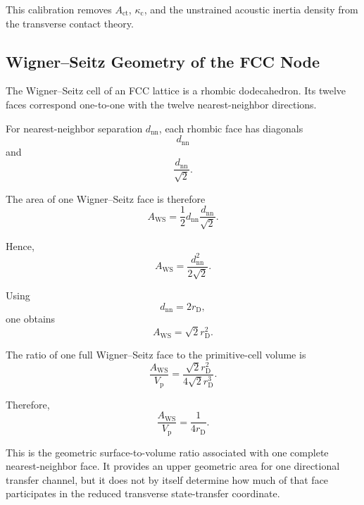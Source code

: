 This calibration removes $A_{\mathrm{ct}}$, $\kappa_{\mathrm{c}}$, and the unstrained acoustic inertia density from the transverse contact theory.

\subsection{Wigner--Seitz Geometry of the FCC Node}

The Wigner--Seitz cell of an FCC lattice is a rhombic dodecahedron. Its twelve faces correspond one-to-one with the twelve nearest-neighbor directions.

For nearest-neighbor separation $d_{\mathrm{nn}}$, each rhombic face has diagonals
\begin{equation}
    d_{\mathrm{nn}}
\end{equation}
and
\begin{equation}
    \frac{d_{\mathrm{nn}}}{\sqrt{2}}.
\end{equation}

The area of one Wigner--Seitz face is therefore
\begin{equation}
    A_{\mathrm{WS}} = \frac{1}{2} d_{\mathrm{nn}} \frac{d_{\mathrm{nn}}}{\sqrt{2}}.
\end{equation}

Hence,
\begin{equation}
    \boxed{ A_{\mathrm{WS}} = \frac{d_{\mathrm{nn}}^2}{2\sqrt{2}} }.
\end{equation}

Using
\begin{equation}
    d_{\mathrm{nn}} = 2r_{\mathrm{D}},
\end{equation}
one obtains
\begin{equation}
    \boxed{ A_{\mathrm{WS}} = \sqrt{2}r_{\mathrm{D}}^2 }.
\end{equation}

The ratio of one full Wigner--Seitz face to the primitive-cell volume is
\begin{equation}
    \frac{A_{\mathrm{WS}}}{V_{\mathrm{p}}} = \frac{ \sqrt{2}r_{\mathrm{D}}^2 }{ 4\sqrt{2}r_{\mathrm{D}}^3 }.
\end{equation}

Therefore,
\begin{equation}
    \boxed{ \frac{A_{\mathrm{WS}}}{V_{\mathrm{p}}} = \frac{1}{4r_{\mathrm{D}}} }.
\end{equation}

This is the geometric surface-to-volume ratio associated with one complete nearest-neighbor face. It provides an upper geometric area for one directional transfer channel, but it does not by itself determine how much of that face participates in the reduced transverse state-transfer coordinate.


